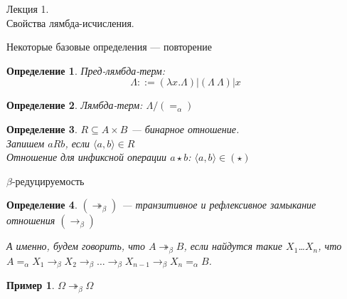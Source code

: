 \documentclass[aspectratio=169]{beamer}
\begin{document}
\newtheorem{dfn}{Определение}[section]
\newtheorem{nte}{Замечание}[section]

\newtheorem{axiom}{Аксиома}[section]
\newtheorem{thm}{Теорема}[section]
\newtheorem{lmm}[theorem]{Лемма}
\newtheorem{statement}{Утверждение}[section]
\newtheorem{oun_paragraph}{Пункт}[section]
\newtheorem{cons}{Следствие}[section]
\newtheorem*{exm}{Пример}

\newcommand{\comb}[1]{\operatorname{\bf{\textrm{#1}}}}
\newcommand{\func}[1]{\operatorname{#1}}
\newcommand{\reduction}[1]{{\color{OrangeRed}#1}}
\newcommand{\set}[1]{\left\{#1\right\}}

\def\from#1{\par \parbox{0.7\textwidth}{\par \hfill\raggedleft \it #1}} 

\begin{frame}{}
\begin{center}\Large Лекция 1.\\ \Large Свойства лямбда-исчисления.\end{center}
\end{frame}

\begin{frame}{Некоторые базовые определения --- повторение}
\begin{dfn}Пред-лямбда-терм:
$$\Lambda ::= (\lambda x.\Lambda) | (\Lambda\ \Lambda) | x$$
\end{dfn}
\begin{dfn}Лямбда-терм: $\Lambda/(=_\alpha)$
\end{dfn}

\begin{dfn}$R \subseteq A \times B$ --- бинарное отношение.\\
Запишем $aRb$, если $\langle a, b \rangle \in R$\\
Отношение для инфиксной операции $a \star b$: $\langle a,b \rangle \in (\star)$
\end{dfn}
\end{frame}

\begin{frame}{$\beta$-редуцируемость}
\begin{dfn}
	$(\twoheadrightarrow_\beta)$ --- транзитивное и рефлексивное замыкание отношения $(\rightarrow_\beta)$

	А именно, будем говорить, что $A\twoheadrightarrow_{\beta}B$, если найдутся такие $X_{1}$\ldots $X_{n}$, что $A=_{\alpha}X_{1}\to_{\beta}X_{2}\to_{\beta}\ldots\to_{\beta}X_{n-1}\to_{\beta}X_{n}=_{\alpha}B$.
\end{dfn}

\begin{exm}
	$\Omega\twoheadrightarrow_{\beta}\Omega$
\end{exm}
\end{frame}
\end{document}

